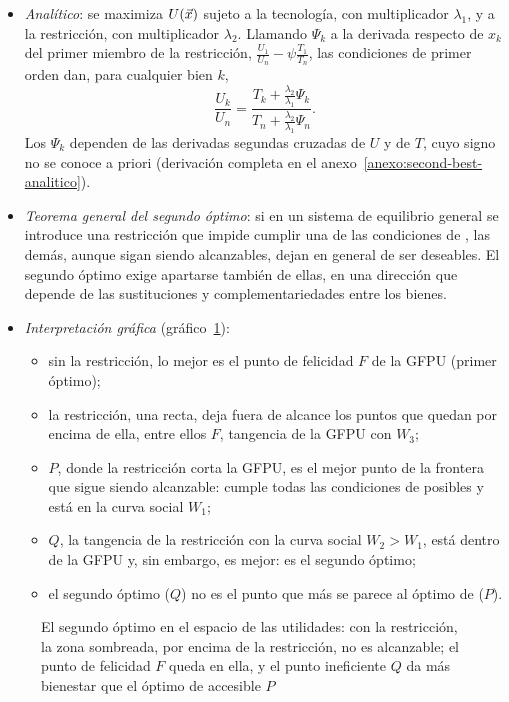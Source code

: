 \documentclass[11pt]{article}
\begin{document}
\begin{itemize}
\item \emph{Analítico}: se maximiza $U(\vec{x})$ sujeto a la tecnología, con multiplicador $\lambda_1$, y a la restricción, con multiplicador $\lambda_2$. Llamando $\Psi_k$ a la derivada respecto de $x_k$ del primer miembro de la restricción, $\frac{U_1}{U_n}-\psi\frac{T_1}{T_n}$, las condiciones de primer orden dan, para cualquier bien $k$,
$$\frac{U_k}{U_n}=\frac{T_k+\frac{\lambda_2}{\lambda_1}\Psi_k}{T_n+\frac{\lambda_2}{\lambda_1}\Psi_n}.$$
  Los $\Psi_k$ dependen de las derivadas segundas cruzadas de $U$ y de $T$, cuyo signo no se conoce a priori (derivación completa en el anexo~\ref{anexo:second-best-analitico}).
\item \emph{Teorema general del segundo óptimo}\nocite{LipseyLancaster1956General}: si en un sistema de equilibrio general se introduce una restricción que impide cumplir una de las condiciones de , las demás, aunque sigan siendo alcanzables, dejan en general de ser deseables. El segundo óptimo exige apartarse también de ellas, en una dirección que depende de las sustituciones y complementariedades entre los bienes.
\item \emph{Interpretación gráfica} (gráfico~\ref{fig:second-best-gfpu}):
  \begin{itemize}
  \item sin la restricción, lo mejor es el punto de felicidad $F$ de la GFPU (primer óptimo);
  \item la restricción, una recta, deja fuera de alcance los puntos que quedan por encima de ella, entre ellos $F$, tangencia de la GFPU con $W_3$;
  \item $P$, donde la restricción corta la GFPU, es el mejor punto de la frontera que sigue siendo alcanzable: cumple todas las condiciones de  posibles y está en la curva social $W_1$;
  \item $Q$, la tangencia de la restricción con la curva social $W_2>W_1$, está dentro de la GFPU y, sin embargo, es mejor: es el segundo óptimo;
  \item el segundo óptimo ($Q$) no es el punto que más se parece al óptimo de  ($P$).
  \end{itemize}
\end{itemize}

\begin{figure}[H]
\centering
\caption{El segundo óptimo en el espacio de las utilidades: con la restricción, la zona sombreada, por encima de la restricción, no es alcanzable; el punto de felicidad $F$ queda en ella, y el punto ineficiente $Q$ da más bienestar que el óptimo de  accesible $P$}\label{fig:second-best-gfpu}
\end{figure}
\end{document}

